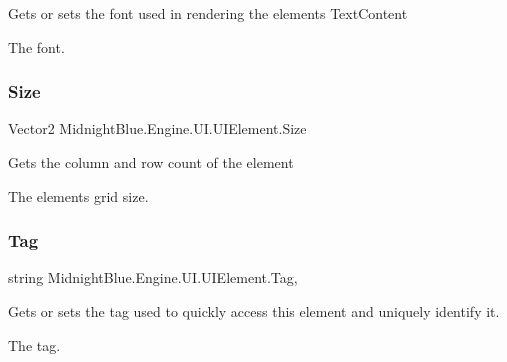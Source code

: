 Gets or sets the font used in rendering the elements Text\+Content 

The font.\hypertarget{class_midnight_blue_1_1_engine_1_1_u_i_1_1_u_i_element_a68f0fdf9795a81e8d67040531e04f63e}{}\label{class_midnight_blue_1_1_engine_1_1_u_i_1_1_u_i_element_a68f0fdf9795a81e8d67040531e04f63e} 
\subsubsection{\texorpdfstring{Size}{Size}}
{\footnotesize\ttfamily Vector2 Midnight\+Blue.\+Engine.\+U\+I.\+U\+I\+Element.\+Size\hspace{0.3cm}{\ttfamily [get]}}



Gets the column and row count of the element 

The elements grid size.\hypertarget{class_midnight_blue_1_1_engine_1_1_u_i_1_1_u_i_element_adddf1a9824fdd14771685ac3c188bb6b}{}\label{class_midnight_blue_1_1_engine_1_1_u_i_1_1_u_i_element_adddf1a9824fdd14771685ac3c188bb6b} 
\subsubsection{\texorpdfstring{Tag}{Tag}}
{\footnotesize\ttfamily string Midnight\+Blue.\+Engine.\+U\+I.\+U\+I\+Element.\+Tag\hspace{0.3cm}{\ttfamily [get]}, {\ttfamily [set]}}



Gets or sets the tag used to quickly access this element and uniquely identify it. 

The tag.\hypertarget{class_midnight_blue_1_1_engine_1_1_u_i_1_1_u_i_element_ad8a234b2f0042ba37f73d805f7ab2746}{}\label{class_midnight_blue_1_1_engine_1_1_u_i_1_1_u_i_element_ad8a234b2f0042ba37f73d805f7ab2746} 
